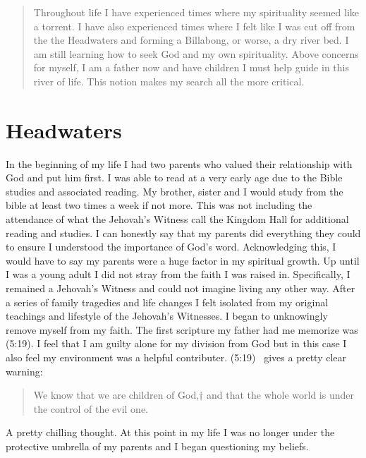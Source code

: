 \documentclass[11pt,a4paper]{scrartcl} %
\begin{document}
    \begin{abstract}
Throughout life I have experienced times where my spirituality seemed like a torrent. I have also experienced times where I felt like I was cut off from the the Headwaters and forming a Billabong, or worse, a dry river bed. I am still learning how to seek God and my own spirituality. Above concerns for myself, I am a father now and have children I must help guide in this river of life. This notion makes my search all the more critical.
    \end{abstract}
       
    \tableofcontents
    
    \section{Headwaters}
\begin{doublespace}
In the beginning of my life I had two parents who valued their relationship with God and put him first. I was able to read at a very early age due to the Bible studies and associated reading. My brother, sister and I would study from the bible at least two times a week if not more. This was not including the attendance of what the Jehovah's Witness call the Kingdom Hall for additional reading and studies. I can honestly say that my parents did everything they could to ensure I understood the importance of God's word. Acknowledging this, I would have to say my parents were a huge factor in my spiritual growth. Up until I was a young adult I did not stray from the faith I was raised in. Specifically, I remained a Jehovah's Witness and could not imagine living any other way. After a series of family tragedies and life changes I felt isolated from my original teachings and lifestyle of the Jehovah's Witnesses.  I began to unknowingly remove myself from my faith. The first scripture my father had me memorize was (5:19). I feel that I am guilty alone for my division from God but in this case I also feel my environment was a helpful contributer. (5:19)~\cite{niv} gives a pretty clear warning:
\begin{verse}
We know that we are children of God,† and that the whole world is under the control of the evil one.
\end{verse}
A pretty chilling thought. At this point in my life I was no longer under the protective umbrella of my parents and I began questioning my beliefs.
\end{doublespace}
\end{document}
